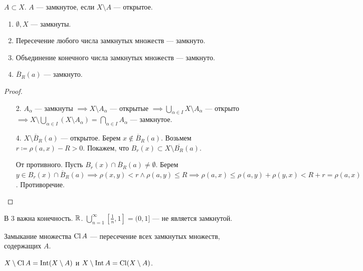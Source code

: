\begin{definition}
    $A \subset X$.  $A$ --- замкнутое, если  $X \setminus A$ --- открытое.
\end{definition}
\begin{theorem}
    \begin{enumerate}
        \item $\emptyset, X$ --- замкнуты.
        \item Пересечение любого числа замкнутых множеств --- замкнуто. 
        \item Объединение конечного числа замкнутых множеств --- замкнуто.
        \item  $\overline{B}_R(a)$ --- замкнуто.
    \end{enumerate}
\end{theorem}
\begin{proof}
    \begin{enumerate}
        \item[2.] $A_\alpha$ --- замкнуты  $\implies X \setminus A_\alpha$ --- открытые  $\implies \bigcup\limits_{\alpha \in I} X \setminus A_\alpha$ --- открыто  $\implies X \setminus  \bigcup\limits_{\alpha \in I} (X \setminus A_{\alpha}) = \bigcap\limits_{\alpha \in I} A_\alpha$ --- замкнутое.
        \item[4.] $X \setminus \overline{B}_R(a)$ --- открытое. Берем  $x \notin \overline{B}_R(a)$. Возьмем $r \coloneqq \rho(a, x) - R > 0$. Покажем, что  $B_r(x) \subset X \setminus \overline{B_R}(a)$.

            От противного. Пусть $B_r(x) \cap \overline{B}_R(a) \neq \emptyset$. Берем  $y \in B_r(x) \cap \overline{B}_R(a) \implies \rho(x, y) < r \land \rho(a, y) \le R \implies \rho(a, x) \le \rho(a, y) + \rho(y, x) < R + r = \rho(a, x)$. Противоречие.
    \end{enumerate}
\end{proof}
\begin{remark}
    В 3 важна конечность. $\mathbb{R}$.  $\bigcup\limits_{n=1}^{\infty} [\frac{1}{n}, 1] = (0, 1]$ --- не является замкнутой.
\end{remark}
\begin{definition}
    Замыкание множества $\operatorname{Cl} A$ --- пересечение всех замкнутых множеств, содержащих  $A$.
\end{definition}
\begin{theorem}
    $X \setminus \operatorname{Cl} A = \operatorname{Int}(X \setminus A)$ и  $X \setminus \operatorname{Int} A = \operatorname{Cl}(X \setminus A)$.
\end{theorem}
